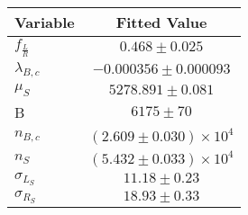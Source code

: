 \begin{tabular}[t]{lc}
\hline
Variable &Fitted Value\\
\hline\hline
$f_{\frac{L}{R}}$&$0.468\pm0.025$\\
\hline
$\lambda_{B,c}$&$-0.000356\pm0.000093$\\
\hline
$\mu_S$&$5278.891\pm0.081$\\
\hline
B&$6175\pm70$\\
\hline
$n_{B,c}$&$(2.609\pm0.030)\times 10^4$\\
\hline
$n_S$&$(5.432\pm0.033)\times 10^4$\\
\hline
$\sigma_{L_S}$&$11.18\pm0.23$\\
\hline
$\sigma_{R_S}$&$18.93\pm0.33$\\
\hline
\end{tabular}